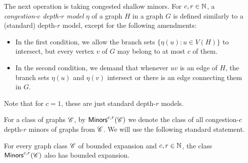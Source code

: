 The next operation is taking congested shallow minors. For $c,r\in \mathbb{N}$, a \emph{congestion-$c$ depth-$r$ model} $\eta$ of a graph $H$ in a graph $G$ is defined similarly to a (standard) depth-$r$ model, except for the following amendments:
\begin{itemize}
	\item In the first condition, we allow the branch sets $\{\eta(u)\colon u\in V(H)\}$ to intersect, but every vertex $v$ of $G$ may belong to at most $c$ of them.
	\item In the second condition, we demand that whenever $uv$ is an edge of $H$, the branch sets $\eta(u)$ and $\eta(v)$ intersect or there is an edge connecting them in $G$.
\end{itemize}
Note that for $c=1$, these are just standard depth-$r$ models.

For a class of graphs $\mathscr C$, by $\mathsf{Minors}^{c,r}(\mathscr C)$ we denote the class of all congestion-$c$ depth-$r$ minors of graphs from $\mathscr C$. We will use the following standard statement.

\begin{theorem}\label{thm:cong-minors}
	For every graph class $\mathscr C$ of bounded expansion and $c,r\in \mathbb{N}$, the class $\mathsf{Minors}^{c,r}(\mathscr C)$ also has bounded expansion.
\end{theorem}


